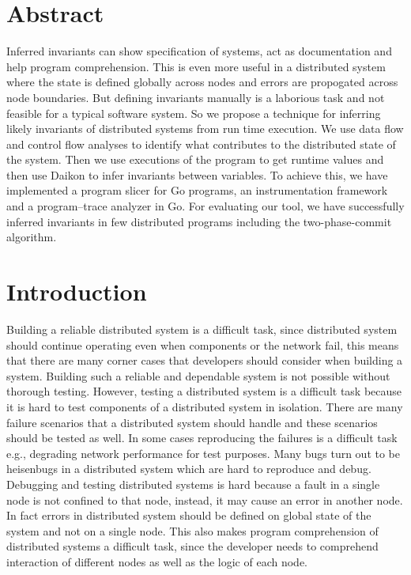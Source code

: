 \section{Abstract}

Inferred invariants can show specification of systems, act as documentation and help program comprehension. This is even more useful in a distributed system where the state is defined globally across nodes and errors are propogated across node boundaries. But defining invariants manually is a laborious task and not feasible for a typical software system. So we propose a technique for inferring likely invariants of distributed systems from run time execution. We use data flow and control flow analyses to identify what contributes to the distributed state of the system. Then we use executions of the program to get runtime values and then use Daikon to infer invariants between variables. To achieve this, we have implemented a program slicer for Go programs, an instrumentation framework and a program--trace analyzer in Go. For evaluating our tool, we have successfully inferred invariants in few distributed programs including the two-phase-commit algorithm.

\section{Introduction}

Building a reliable distributed system is a difficult task, since distributed system should continue operating even when components or the network fail, this means that there are many corner cases that developers should consider when building a system. Building such 
a reliable and dependable system is not possible without thorough testing. However, testing a distributed system is a difficult task because it is hard to test components of a distributed system in isolation. There are many 
failure scenarios that a distributed system should handle and these scenarios should be tested as well. In some cases reproducing the failures is a difficult task e.g., degrading network performance for test purposes. Many bugs turn out to be heisenbugs in a distributed 
system which are hard to reproduce and debug. Debugging and testing distributed systems is hard because a fault in a single node is not confined to that node, instead, it may cause an error in another node. In fact errors in distributed system should be defined on global state of the system and not on a single node. This also makes program comprehension of distributed systems a difficult task, since the developer needs to comprehend interaction of different nodes as well as the logic of each node.

